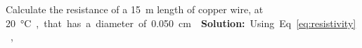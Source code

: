 \begin{example}
  Calculate the resistance of a \SI{15}{\metre} length of copper wire, at
  \SI{20}\celsius, that has a diameter of \SI{.050}{\centi\metre}.

  \vspace{.1in}\textbf{Solution:} Using Eq.~\ref{eq:resistivity},
\end{example}



%
%  





